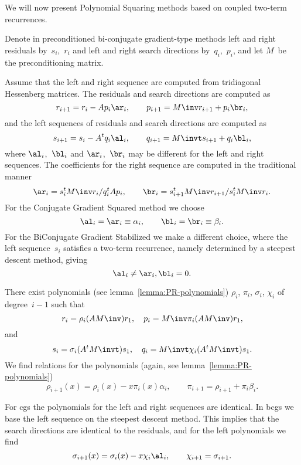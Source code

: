 \def\B#1#2{\fbox{$\,#1$}_{#2}}

We will now present Polynomial Squaring methods based on coupled
two-term recurrences.

Denote in preconditioned bi-conjugate gradient-type methods left and right
residuals by~$s_i$,~$r_i$ and left and right search directions
by~$q_i$,~$p_i$, and let
$M$~be the preconditioning matrix.

Assume that the left and right sequence are computed
from tridiagonal Hessenberg matrices.
The residuals and search directions are computed as
\[ r_{i+1}=r_i-Ap_i\ar_i,\qquad p_{i+1}=M\inv r_{i+1}+p_i\br_i, \]
and the left sequences of residuals and search directions
are computed as
\[ s_{i+1}=s_i-A^tq_i\al_i,\qquad
	q_{i+1}=M\invt s_{i+1}+q_i\bl_i, \]
where $\al_i$,~$\bl_i$ and $\ar_i$,~$\br_i$
may be different for the left and right sequences.
The coefficients for the right sequence are computed in the
traditional manner
\[ \ar_i=s_i^tM\inv r_i/q_i^tAp_i, \qquad
	\br_i=s_{i+1}^tM\inv r_{i+1}/s_i^tM\inv r_i. \]
For the Conjugate Gradient Squared 
method we choose
\[ \al_i=\ar_i\equiv\alpha_i,\qquad \bl_i=\br_i\equiv\beta_i. \]
For the BiConjugate Gradient Stabilized
we make a different choice, where the left sequence~$s_i$
satisfies a two-term recurrence,
namely determined by a steepest descent method, giving
\[ \al_i\not=\ar_i, \bl_i=0. \]

There exist
polynomials (see lemma~\ref{lemma:PR-polynomials})
$\rho_i$, $\pi_i$, $\sigma_i$, $\chi_i$
of degree~$i-1$ such that
\[ r_i=\rho_i(AM\inv)r_1,\quad p_i=M\inv\pi_i(AM\inv)r_1,\]
and
\[ s_i=\sigma_i(A^tM\invt)s_1,\quad	q_i=M\invt\chi_i(A^tM\invt)s_1. \]
We find relations for the polynomials 
(again, see lemma~\ref{lemma:PR-polynomials})
\[ \rho_{i+1}(x)=\rho_i(x)-x\pi_i(x)\alpha_i,\qquad
	\pi_{i+1}=\rho_{i+1}+\pi_i\beta_i. \]

\iffalse
In the following derivation of the cgs and bcgs methods, the
polynomials $\rho_i$ and~$\pi_i$ will be taken to refer to the left
sequences $s_i$ and~$q_i$, and we will not explicitly talk about the
polynomials of the right sequences.\fi

For cgs the polynomials for the left and right sequences are identical.
In bcgs we base the left sequence on the steepest descent method.
This implies that the search directions are identical to the
residuals, and for the left polynomials we find
\begin{equation}
    \sigma_{i+1}(x)=\sigma_i(x)-x\chi_i\al_i,
    \qquad \chi_{i+1}=\sigma_{i+1}.
    \label{eq:bcgs-left-poly}\end{equation}

